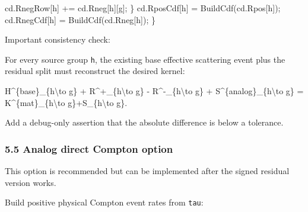 \documentclass[
]{article}
\newenvironment{Shaded}{}{}
\newcommand{\NormalTok}[1]{#1}
\newcommand{\OperatorTok}[1]{\textcolor[rgb]{0.40,0.40,0.40}{#1}}
\begin{document}
\begin{Shaded}
\begin{Highlighting}[]
\NormalTok{        cd}\OperatorTok{.}\NormalTok{RnegRow}\OperatorTok{[}\NormalTok{h}\OperatorTok{]} \OperatorTok{+=}\NormalTok{ cd}\OperatorTok{.}\NormalTok{Rneg}\OperatorTok{[}\NormalTok{h}\OperatorTok{][}\NormalTok{g}\OperatorTok{];}
    \OperatorTok{\}}
\NormalTok{    cd}\OperatorTok{.}\NormalTok{RposCdf}\OperatorTok{[}\NormalTok{h}\OperatorTok{]} \OperatorTok{=}\NormalTok{ BuildCdf}\OperatorTok{(}\NormalTok{cd}\OperatorTok{.}\NormalTok{Rpos}\OperatorTok{[}\NormalTok{h}\OperatorTok{]);}
\NormalTok{    cd}\OperatorTok{.}\NormalTok{RnegCdf}\OperatorTok{[}\NormalTok{h}\OperatorTok{]} \OperatorTok{=}\NormalTok{ BuildCdf}\OperatorTok{(}\NormalTok{cd}\OperatorTok{.}\NormalTok{Rneg}\OperatorTok{[}\NormalTok{h}\OperatorTok{]);}
\OperatorTok{\}}
\end{Highlighting}
\end{Shaded}

Important consistency check:

For every source group \texttt{h}, the existing base effective
scattering event plus the residual split must reconstruct the desired
kernel:

\begin{Shaded}
\begin{Highlighting}[]
\NormalTok{H\^{}\{base\}\_\{h\textbackslash{}to g\} + R\^{}+\_\{h\textbackslash{}to g\} {-} R\^{}{-}\_\{h\textbackslash{}to g\} + S\^{}\{analog\}\_\{h\textbackslash{}to g\}}
\NormalTok{= K\^{}\{mat\}\_\{h\textbackslash{}to g\}+S\_\{h\textbackslash{}to g\}.}
\end{Highlighting}
\end{Shaded}

Add a debug-only assertion that the absolute difference is below a
tolerance.

\subsubsection{5.5 Analog direct Compton
option}\label{analog-direct-compton-option}

This option is recommended but can be implemented after the signed
residual version works.

Build positive physical Compton event rates from \texttt{tau}:
\end{document}
